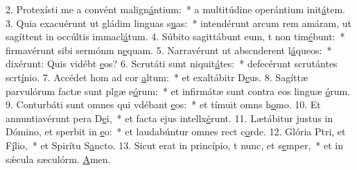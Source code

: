 2. Protexísti me a convént malign\uline{á}ntium:~* a multitúdine operántium init\uline{á}tem.
3. Quia exacuérunt ut gládim linguas s\uline{u}as:~* intendérunt arcum rem amáram, ut sagíttent in occúltis immacl\uline{á}tum.
4. Súbito sagittábunt eum, t non tim\uline{é}bunt:~* firmavérunt sibi sermónm n\uline{e}quam.
5. Narravérunt ut abscnderent l\uline{á}queos:~* dixérunt: Quis vidébt \uline{e}os?
6. Scrutáti sunt niquit\uline{á}tes:~* defecérunt scrutántes scrt\uline{í}nio.
7. Accédet hom ad cor \uline{a}ltum:~* et exaltábitr D\uline{e}us.
8. Sagíttæ parvulórum factæ sunt plgæ e\uline{ó}rum:~* et infirmátæ sunt contra eos linguæ \uline{ó}rum.
9. Conturbáti sunt omnes qui vdébant \uline{e}os:~* et tímuit omns h\uline{o}mo.
10. Et annuntiavérunt pera D\uline{e}i,~* et facta ejus intellx\uline{é}runt.
11. Lætábitur justus in Dómino, et sperbit in \uline{e}o:~* et laudabúntur omnes rect c\uline{o}rde.
12. Glória Ptri, et F\uline{í}lio,~* et Spirítu S\uline{a}ncto.
13. Sicut erat in princípio, t nunc, et s\uline{e}mper,~* et in sǽcula sæculórm. \uline{A}men.
